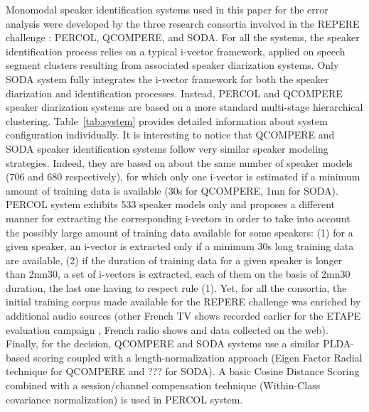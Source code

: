 Monomodal speaker identification systems used in this paper for the error analysis were developed by the three research consortia involved in the REPERE challenge : PERCOL, QCOMPERE, and SODA. For all the systems, the speaker identification process relies on a typical i-vector framework, applied on speech segment clusters resulting from associated speaker diarization systems. Only SODA system  \cite{dupuy2014}  fully integrates the i-vector framework for both the speaker diarization and identification processes. Instead, PERCOL and QCOMPERE speaker diarization systems \cite{Barras2006,charlet2013} are based on a more standard multi-stage hierarchical clustering. Table~\ref{tab:system} provides detailed information about system configuration individually. It is interesting to notice that QCOMPERE and SODA speaker identification systems follow very similar speaker modeling strategies. Indeed, they are based on about the same number of speaker models (706 and 680 respectively), for which only one i-vector is estimated if a minimum amount of training data is available (30s for QCOMPERE, 1mn for SODA).  PERCOL system exhibits 533 speaker models only and proposes a different manner for extracting the corresponding i-vectors in order to take into account the possibly large amount of training data available for some speakers:  (1) for a given speaker, an i-vector is extracted only if a minimum 30s long training data are available, (2) if the duration of training data for a given speaker is longer than 2mn30, a set of i-vectors is extracted, each of them on the basis of 2mn30 duration, the last one having to respect rule (1). Yet, for all the consortia, the initial training corpus made available for the REPERE challenge was enriched by additional audio sources (other French TV shows recorded earlier for the ETAPE evaluation campaign \cite{gravier2012}, French radio shows and data collected on the web).
Finally, for the decision, QCOMPERE and SODA systems use a similar PLDA-based scoring coupled with a length-normalization approach (Eigen Factor Radial technique for QCOMPERE and ??? for SODA). A basic Cosine Distance Scoring combined with a session/channel compensation technique (Within-Class covariance normalization)  is used in PERCOL system.


